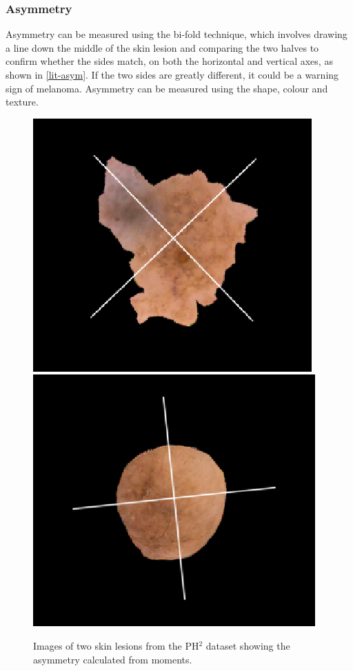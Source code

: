 \subsubsection{Asymmetry}
Asymmetry can be measured using the bi-fold technique, which involves drawing a line down the middle of the skin lesion and comparing the two halves to confirm whether the sides match, on both the horizontal and vertical axes, as shown in \ref{lit-asym}. If the two sides are greatly different, it could be a warning sign of melanoma. Asymmetry can be measured using the shape\cite{Zaqout2016}, colour\cite{Kasmi2016} and texture\cite{Ali2020a}.

\begin{figure} 
\centering
\includegraphics[scale=0.5]{images/asym1.png}
\includegraphics[scale=0.5]{images/asym2.png}
\caption{Images of two skin lesions from the PH$^2$ dataset showing the asymmetry calculated from moments.}
\end{figure} \label{lit-asym}

